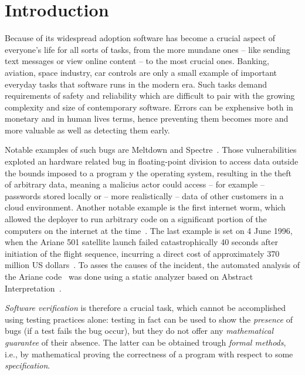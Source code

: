 \chapter*{Introduction}\label{ch:intro}

Because of its widespread adoption software has become a crucial
aspect of everyone's life for all sorts of tasks, from the more
mundane ones -- like sending text messages or view online content --
to the most crucial ones. Banking, aviation, space industry, car
controls are only a small example of important everyday tasks that
software runs in the modern era. Such tasks demand requirements of
safety and reliability which are difficult to pair with the growing
complexity and size of contemporary software. Errors can be exphensive
both in monetary and in human lives terms, hence preventing them
becomes more and more valuable as well as detecting them early.

\medskip

Notable examples of such bugs are Meltdown and
Spectre~\cite{art:meltdown,art:spectre}. Those vulnerabilities
exploted an hardware related bug in floating-point division to access
data outside the bounds imposed to a program y the operating system,
resulting in the theft of arbitrary data, meaning a malicius actor
could access -- for example -- passwords stored locally or -- more
realistically -- data of other customers in a cloud environment.
Another notable example is the first internet worm, which allowed the
deployer to run arbitrary code on a significant portion of the
computers on the internet at the
time~\cite{art:worm1,art:worm2,art:worm3,art:worm4}.  The last example
is set on 4 June 1996, when the Ariane 501 satellite launch failed
catastrophically 40 seconds after initiation of the flight sequence,
incurring a direct cost of approximately 370 million US
dollars~\cite{10.1145/251880.251992}. To asses the causes of the
incident, the automated analysis of the Ariane
code~\cite{art:arianecode} was done using a static analyzer based on
Abstract Interpretation~\cite{art:arianeabstract}.

\medskip

\emph{Software verification} is therefore a crucial task, which cannot
be accomplished using testing practices alone: testing in fact can be
used to show the \emph{presence} of bugs (if a test fails the bug
occur), but they do not offer any \emph{mathematical guarantee} of
their absence. The latter can be obtained trough \emph{formal
  methods}, i.e., by mathematical proving the correctness of a program
with respect to some \emph{specification}.

